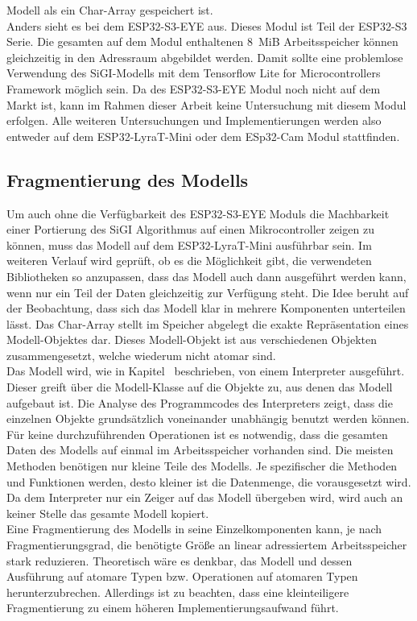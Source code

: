 Modell als ein Char-Array gespeichert ist.\\ Anders sieht es bei dem ESP32-S3-EYE aus. Dieses Modul ist Teil der ESP32-S3 Serie. Die gesamten auf dem Modul enthaltenen \SI{8}{MiB} Arbeitsspeicher können gleichzeitig in den Adressraum abgebildet werden. Damit sollte eine problemlose Verwendung des SiGI-Modells mit dem Tensorflow Lite for Microcontrollers Framework möglich sein. Da des ESP32-S3-EYE Modul noch nicht auf dem Markt ist, kann im Rahmen dieser Arbeit keine Untersuchung mit diesem Modul erfolgen. Alle weiteren Untersuchungen und Implementierungen werden also entweder auf dem ESP32-LyraT-Mini oder dem ESp32-Cam Modul stattfinden.

\subsection{Fragmentierung des Modells}
    Um auch ohne die Verfügbarkeit des ESP32-S3-EYE Moduls die Machbarkeit einer Portierung des SiGI Algorithmus auf einen Mikrocontroller zeigen zu können, muss das Modell auf dem ESP32-LyraT-Mini ausführbar sein. Im weiteren Verlauf wird geprüft, ob es die Möglichkeit gibt, die verwendeten Bibliotheken so anzupassen, dass das Modell auch dann ausgeführt werden kann, wenn nur ein Teil der Daten gleichzeitig zur Verfügung steht. Die Idee beruht auf der Beobachtung, dass sich das Modell klar in mehrere Komponenten unterteilen lässt. Das Char-Array stellt im Speicher abgelegt die exakte Repräsentation eines Modell-Objektes dar. Dieses Modell-Objekt ist aus verschiedenen Objekten zusammengesetzt, welche wiederum nicht atomar sind.\\ Das Modell wird, wie in Kapitel~ beschrieben, von einem Interpreter ausgeführt. Dieser greift über die Modell-Klasse auf die Objekte zu, aus denen das Modell aufgebaut ist. Die Analyse des Programmcodes des Interpreters zeigt, dass die einzelnen Objekte grundsätzlich voneinander unabhängig benutzt werden können. Für keine durchzuführenden Operationen ist es notwendig, dass die gesamten Daten des Modells auf einmal im Arbeitsspeicher vorhanden sind. Die meisten Methoden benötigen nur kleine Teile des Modells. Je spezifischer die Methoden und Funktionen werden, desto kleiner ist die Datenmenge, die vorausgesetzt wird. Da dem Interpreter nur ein Zeiger auf das Modell übergeben wird, wird auch an keiner Stelle das gesamte Modell kopiert.\\ Eine Fragmentierung des Modells in seine Einzelkomponenten kann, je nach Fragmentierungsgrad, die benötigte Größe an linear adressiertem Arbeitsspeicher stark reduzieren. Theoretisch wäre es denkbar, das Modell und dessen Ausführung auf atomare Typen bzw. Operationen auf atomaren Typen herunterzubrechen. Allerdings ist zu beachten, dass eine kleinteiligere Fragmentierung zu einem höheren Implementierungsaufwand führt. 

